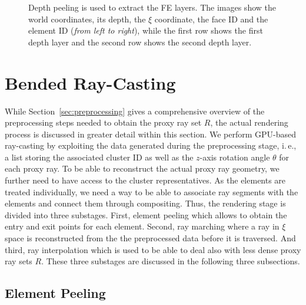 \documentclass[review,journal]{vgtc}         %
\begin{document}
\begin{figure}[t]
    \caption{Depth peeling is used to extract the FE layers. The images show the world coordinates, its depth, the $\xi$ coordinate, the face ID and the element ID ({\it from left to right}), while the first row shows the first depth layer and the second row shows the second depth layer.}
    \label{fig:depthpeeling}
\end{figure}

\section{Bended Ray-Casting}\label{sec:rendering}
While Section~\ref{sec:preprocessing} gives a comprehensive overview of the preprocessing steps needed to obtain the proxy ray set $R$, the actual rendering process is discussed in greater detail within this section. We perform GPU-based ray-casting by exploiting the data generated during the preprocessing stage, i.\,e., a list storing the associated cluster ID as well as the $z$-axis rotation angle $\theta$ for each proxy ray. To be able to reconstruct the actual proxy ray geometry, we further need to have access to the cluster representatives. As the elements are treated individually, we need a way to be able to associate ray segments with the elements and connect them through compositing. Thus, the rendering stage is divided into three substages. First, element peeling which allows to obtain the entry and exit points for each element. Second, ray marching where a ray in $\xi$ space is reconstructed from the the preprocessed data before it is traversed. And third, ray interpolation which is used to be able to deal also with less dense proxy ray sets $R$. These three substages are discussed in the following three subsections.


\subsection{Element Peeling}
\end{document}
